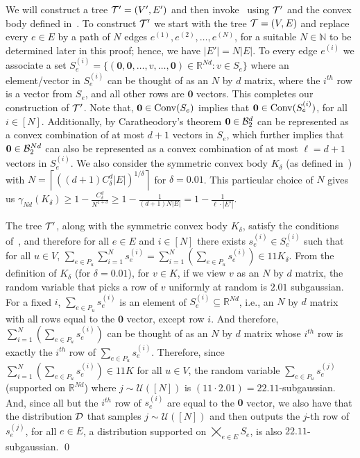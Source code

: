     We will construct a tree $\mathcal{T}' = (V',E')$ and then invoke~ using $\mathcal{T}'$ and the convex body defined in~. To construct $\mathcal{T}'$ we start with the tree $\mathcal{T} = (V,E)$ and replace every $e \in E$ by a path of $N$ edges $e^{(1)}, e^{(2)}, \ldots, e^{(N)}$, for a suitable $N \in \mathbb{N}$ to be determined later in this proof; hence, we have $|E'| = N|E|$. To every edge $e^{(i)}$ we associate a set $S_e^{(i)} = \{(\mathbf{0}, \mathbf{0}, \ldots, v, \ldots, \mathbf{0}) \in \mathbb{R}^{Nd}: v \in S_e\}$ where an element/vector in $S_e^{(i)}$ can be thought of as an $N$ by $d$ matrix, where the $i^{th}$ row is a vector from $S_e$, and all other rows are $\mathbf{0}$ vectors. This completes our construction of $\mathcal{T}'$. Note that, $\mathbf{0} \in \mathrm{Conv}(S_e)$ implies that $\mathbf{0} \in \mathrm{Conv}(S_e^{(i)})$, for all $i \in [N]$. Additionally, by Caratheodory's theorem $\mathbf{0} \in \mathcal{B}^d_2$ can be represented as a convex combination of at most $d+1$ vectors in $S_e$, which further implies that $\mathbf{0} \in \mathcal{B}^{Nd}_2$ can also be represented as a convex combination of at most $\ell = d+1$ vectors in $S^{(i)}_e$. We also consider the symmetric convex body $K_\delta$ (as defined in~) with $N = \left\lceil \left((d+1)C_\delta^d|E|\right)^{1/\delta}\right\rceil$ for $\delta = 0.01$. This particular choice of $N$ gives us $\gamma_{Nd}(K_\delta) \geq 1 - \frac{C_\delta^d}{N^{1+\delta}} \geq 1 - \frac{1}{(d+1)N|E|} = 1 - \frac{1}{\ell \cdot |E'|}$. 
    
    The tree $\mathcal{T}'$, along with the symmetric convex body $K_\delta$, satisfy the conditions of~, and therefore for all $e \in E$ and $i \in [N]$ there exists $s^{(i)}_e \in S^{(i)}_e$ such that for all $u \in V$, $\sum_{e \in P_u} \sum_{i=1}^{N} s^{(i)}_e = \sum_{i=1}^{N} \left( \sum_{e \in P_u} s^{(i)}_e \right) \in 11 K_\delta$. From the definition of $K_\delta$ (for $\delta = 0.01$), for $v \in K$, if we view $v$ as an $N$ by $d$ matrix, the random variable that picks a row of $v$ uniformly at random is $2.01$ subgaussian. 
    For a fixed $i$, $\sum_{e \in P_u} s^{(i)}_e$ is an element of $S_e^{(i)} \subseteq \mathbb{R}^{N d}$, i.e., an $N$ by $d$ matrix with all rows equal to the $\mathbf{0}$ vector, except row $i$. And therefore, $\sum_{i=1}^{N} \left( \sum_{e \in P_u} s^{(i)}_e \right)$ can be thought of as an $N$ by $d$ matrix whose $i^{th}$ row is exactly the $i^{th}$ row of $\sum_{e \in P_u} s^{(i)}_e$. Therefore, since $\sum_{i=1}^{N} \left( \sum_{e \in P_u} s^{(i)}_e \right) \in 11 K$ for all $u \in V$, the random variable $\sum_{e \in P_u} s^{(j)}_e$ (supported on $\mathbb{R}^{Nd}$) where $j \sim \mathcal{U}([N])$ is $\left(11 \cdot 2.01 \right) = 22.11$-subgaussian. And, since all but the $i^{th}$ row of $s^{(i)}_e$ are equal to the $\mathbf{0}$ vector, we also have that the distribution $\mathcal{D}$ that samples $j \sim \mathcal{U}([N])$ and then outputs the $j$-th row of $s^{(j)}_e$, for all $e \in E$, a distribution supported on $\bigtimes_{e \in E} S_e$, is also $22.11$-subgaussian. \qed

